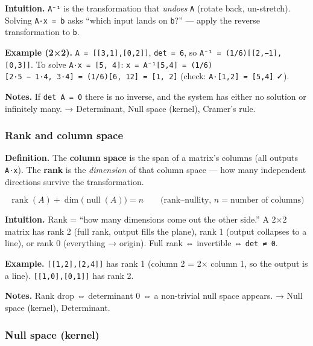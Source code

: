 \documentclass[
  10pt,
  letterpaper,
  onecolumn]{article}
\begin{document}
\textbf{Intuition.} \texttt{A⁻¹} is the transformation that
\emph{undoes} \texttt{A} (rotate back, un-stretch). Solving
\texttt{A·x\ =\ b} asks ``which input lands on \texttt{b}?'' --- apply
the reverse transformation to \texttt{b}.

\textbf{Example (2×2).} \texttt{A\ =\ {[}{[}3,1{]},{[}0,2{]}{]}},
\texttt{det\ =\ 6}, so \texttt{A⁻¹\ =\ (1/6){[}{[}2,−1{]},{[}0,3{]}{]}}.
To solve \texttt{A·x\ =\ {[}5,\ 4{]}}:
\texttt{x\ =\ A⁻¹{[}5,4{]}\ =\ (1/6){[}2·5\ −\ 1·4,\ 3·4{]}\ =\ (1/6){[}6,\ 12{]}\ =\ {[}1,\ 2{]}}
(check: \texttt{A·{[}1,2{]}\ =\ {[}5,4{]}} ✓).

\textbf{Notes.} If \texttt{det\ A\ =\ 0} there is no inverse, and the
system has either no solution or infinitely many. → Determinant, Null
space (kernel), Cramer's rule.

\hypertarget{rank-and-column-space}{%
\subsubsection{Rank and column space}\label{rank-and-column-space}}

\textbf{Definition.} The \textbf{column space} is the span of a matrix's
columns (all outputs \texttt{A·x}). The \textbf{rank} is the
\emph{dimension} of that column space --- how many independent
directions survive the transformation.

\begin{equation*}
\operatorname{rank}(A)+\dim\bigl(\operatorname{null}(A)\bigr)=n
\qquad\text{(rank--nullity, }n=\text{number of columns)}
\end{equation*}

\textbf{Intuition.} Rank = ``how many dimensions come out the other
side.'' A 2×2 matrix has rank 2 (full rank, output fills the plane),
rank 1 (output collapses to a line), or rank 0 (everything → origin).
Full rank ⇔ invertible ⇔ \texttt{det\ ≠\ 0}.

\textbf{Example.} \texttt{{[}{[}1,2{]},{[}2,4{]}{]}} has rank 1 (column
2 = 2× column 1, so the output is a line).
\texttt{{[}{[}1,0{]},{[}0,1{]}{]}} has rank 2.

\textbf{Notes.} Rank drop ⇔ determinant 0 ⇔ a non-trivial null space
appears. → Null space (kernel), Determinant.

\hypertarget{null-space-kernel}{%
\subsubsection{Null space (kernel)}\label{null-space-kernel}}
\end{document}

